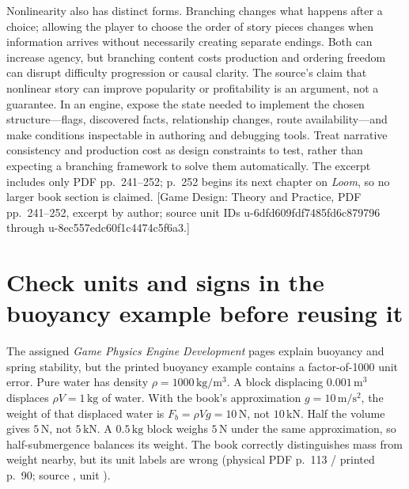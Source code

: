 Nonlinearity also has distinct forms. Branching changes what happens after a choice; allowing the player to choose the order of story pieces changes when information arrives without necessarily creating separate endings. Both can increase agency, but branching content costs production and ordering freedom can disrupt difficulty progression or causal clarity. The source's claim that nonlinear story can improve popularity or profitability is an argument, not a guarantee. In an engine, expose the state needed to implement the chosen structure---flags, discovered facts, relationship changes, route availability---and make conditions inspectable in authoring and debugging tools. Treat narrative consistency and production cost as design constraints to test, rather than expecting a branching framework to solve them automatically. The excerpt includes only PDF pp.~241--252; p.~252 begins its next chapter on \emph{Loom}, so no larger book section is claimed. {[}Game Design: Theory and Practice, PDF pp.~241--252, excerpt by author; source unit IDs u-6dfd609fdf7485fd6c879796 through u-8ec557edc60f1c4474c5f6a3.{]}

\section{Check units and signs in the buoyancy example before reusing it}\label{06-engine-ii-ch047-check-units-and-signs-in-the-buoyancy-example-before-reusing-it}

\hypertarget{06-engine-ii-ch047-check-units-and-signs-in-the-buoyancy-example-before-reusing-it}{}

The assigned \emph{Game Physics Engine Development} pages explain buoyancy and spring stability, but the printed buoyancy example contains a factor-of-1000 unit error. Pure water has density \(\rho=1000\,\mathrm{kg/m^3}\). A block displacing \(0.001\,\mathrm{m^3}\) displaces \(\rho V=1\,\mathrm{kg}\) of water. With the book's approximation \(g=10\,\mathrm{m/s^2}\), the weight of that displaced water is \(F_b=\rho Vg=10\,\mathrm{N}\), not \(10\,\mathrm{kN}\). Half the volume gives \(5\,\mathrm{N}\), not \(5\,\mathrm{kN}\). A \(0.5\,\mathrm{kg}\) block weighs \(5\,\mathrm{N}\) under the same approximation, so half-submergence balances its weight. The book correctly distinguishes mass from weight nearby, but its unit labels are wrong (physical PDF p.~113 / printed p.~90; source , unit ).

